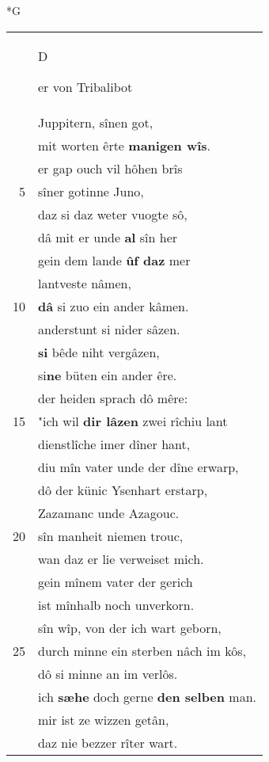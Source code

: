 \documentclass[8pt,a4paper,notitlepage]{article}
\begin{document}
\newpage
\begin{table}[ht]
\begin{minipage}[t]{0.5\linewidth}
\small
\begin{center}*G
\end{center}
\begin{tabular}{rl}
 & \begin{large}D\end{large}er von Tribalibot\\ 
 & Juppitern, sînen got,\\ 
 & mit worten êrte \textbf{manigen wîs}.\\ 
 & er gap ouch vil hôhen brîs\\ 
5 & sîner gotinne Juno,\\ 
 & daz si daz weter vuogte sô,\\ 
 & dâ mit er unde \textbf{al} sîn her\\ 
 & gein dem lande \textbf{ûf daz} mer\\ 
 & lantveste nâmen,\\ 
10 & \textbf{dâ} si zuo ein ander kâmen.\\ 
 & anderstunt si nider sâzen.\\ 
 & \textbf{si} bêde niht vergâzen,\\ 
 & si\textbf{ne} büten ein ander êre.\\ 
 & der heiden sprach dô mêre:\\ 
15 & "ich wil \textbf{dir lâzen} zwei rîchiu lant\\ 
 & dienstlîche imer dîner hant,\\ 
 & diu mîn vater unde der dîne erwarp,\\ 
 & dô der künic Ysenhart erstarp,\\ 
 & Zazamanc unde Azagouc.\\ 
20 & sîn manheit niemen trouc,\\ 
 & wan daz er lie verweiset mich.\\ 
 & gein mînem vater der gerich\\ 
 & ist mînhalb noch unverkorn.\\ 
 & sîn wîp, von der ich wart geborn,\\ 
25 & durch minne ein sterben nâch im kôs,\\ 
 & dô si minne an im verlôs.\\ 
 & ich \textbf{sæhe} doch gerne \textbf{den selben} man.\\ 
 & mir ist ze wizzen getân,\\ 
 & daz nie bezzer rîter wart.\\ 

\end{tabular}
\end{minipage}
\end{table}
\end{document}
